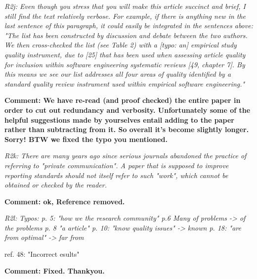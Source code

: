 {\em
R2j: 
Even though you stress that you will make this article succinct and brief, I still find the text relatively verbose. For example, if there is anything new in the last sentence of this paragraph, it could easily be integrated in the sentences above: "The list has been constructed by discussion and debate between the two authors. We then cross-checked the list (see Table 2) with a [typo: an] empirical study quality instrument, due to [25] that has been used when assessing article quality for inclusion within software engineering systematic reviews [49, chapter 7]. By this means we see our list addresses all four areas of quality identified by a standard quality review instrument used within empirical software engineering."
}

{\bf Comment: We have re-read (and proof checked) the entire paper in order to cut out redundancy and verbosity.  Unfortunately some of the helpful suggestions made by yourselves entail adding to the paper rather than subtracting from it.  So overall it's become slightly longer.  Sorry!  BTW we fixed the typo you mentioned.}

{\em
R2k: 
There are many years ago since serious journals abandoned the practice of referring to "private communication". A paper that is supposed to improve reporting standards should not itself refer to such "work", which cannot be obtained or checked by the reader.

}

{\bf Comment: ok, Reference removed.}

{\em
R2l: 
Typos: 
p. 5: "how we the research community"
p.6 Many of problems -> of the problems
p. 8 "a article"
p. 10: "know quality issues" -> known
p. 18: "are from optimal" -> far from

ref. 48:  "Incorrect esults"

}

{\bf Comment: Fixed.  Thankyou.}
